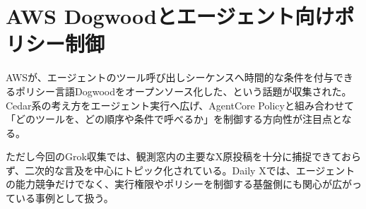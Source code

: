 \section{AWS Dogwoodとエージェント向けポリシー制御}

AWSが、エージェントのツール呼び出しシーケンスへ時間的な条件を付与できるポリシー言語Dogwoodをオープンソース化した、という話題が収集された。Cedar系の考え方をエージェント実行へ広げ、AgentCore Policyと組み合わせて「どのツールを、どの順序や条件で呼べるか」を制御する方向性が注目点となる。

ただし今回のGrok収集では、観測窓内の主要なX原投稿を十分に捕捉できておらず、二次的な言及を中心にトピック化されている。Daily Xでは、エージェントの能力競争だけでなく、実行権限やポリシーを制御する基盤側にも関心が広がっている事例として扱う。
